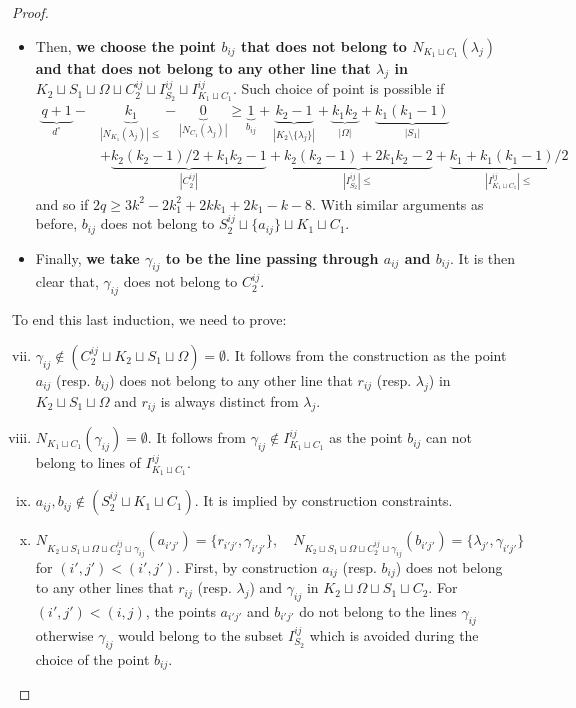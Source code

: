 \documentclass[10pt,a4paper]{article}
\newcommand{\ls}{\leqslant}
\newcommand{\gs}{\geqslant}
\begin{document}
\begin{proof}
\begin{itemize}
            \item Then, \textbf{we choose the point $b_{ij}$ that does not belong to $N_{K_1 \sqcup C_1}(\lambda_j)$ and that does not belong to any other line that $\lambda_j$ in $K_2 \sqcup S_1 \sqcup \Omega \sqcup C_2^{ij} \sqcup I_{S_2}^{ij} \sqcup I_{K_1\sqcup C_1}^{ij}$}. Such choice of point is possible if \begin{align*} \underbrace{q+1}_{d^\circ} - &\underbrace{k_1}_{|N_{K_1}(\lambda_j)|\ls} - \underbrace{0}_{|N_{C_1}(\lambda_j)|} \gs \underbrace{1}_{b_{ij}} + \underbrace{k_2 - 1}_{|K_2 \setminus \{\lambda_j\}|} + \underbrace{k_1k_2}_{|\Omega|} + \underbrace{k_1(k_1-1)}_{|S_1|}\\ &+ \underbrace{k_2(k_2-1)/2+k_1k_2 - 1}_{|C_2^{ij}|} + \underbrace{k_2(k_2-1) + 2k_1k_2 - 2}_{|I_{S_2}^{ij}| \ls} + \underbrace{k_1 + k_1(k_1-1)/2}_{|I_{K_1\sqcup C_1}^{ij}| \ls} \end{align*} and so if $2q \gs 3k^2 - 2k_1^2+2kk_1+2k_1-k-8$. With similar arguments as before,  $b_{ij}$ does not belong to $S_2^{ij} \sqcup \{a_{ij}\} \sqcup K_1 \sqcup C_1$.
            \item Finally, \textbf{we take $\gamma_{ij}$ to be the line passing through  $a_{ij}$ and $b_{ij}$}. It is then clear that, $\gamma_{ij}$ does not belong to $C_2^{ij}$.
        \end{itemize}
        To end this last induction, we need to prove:
        \begin{enumerate}[(i)]
            \setcounter{enumi}{6}
            \item$\gamma_{ij} \notin (C_2^{ij} \sqcup K_2 \sqcup S_1 \sqcup \Omega) = \emptyset$. It follows from the construction as the point $a_{ij}$ (resp. $b_{ij}$) does not belong to any other line that $r_{ij}$ (resp. $\lambda_j$) in $K_2 \sqcup S_1 \sqcup \Omega$ and $r_{ij}$ is always distinct from $\lambda_j$.
            \item $N_{K_1 \sqcup C_1}(\gamma_{ij}) = \emptyset $. It follows from $\gamma_{ij} \notin I_{K_1\sqcup C_1}^{ij}$ as the point $b_{ij}$ can not belong to lines of $I_{K_1\sqcup C_1}^{ij}$.
            \item $a_{ij}, b_{ij} \notin (S_2^{ij} \sqcup K_1 \sqcup C_1)$. It is implied by construction constraints.
            \item $N_{K_2 \sqcup S_1 \sqcup \Omega \sqcup C_2^{ij}\sqcup \gamma_{ij}}(a_{i'j'}) = \{r_{i'j'},\gamma_{i'j'}\}, \quad N_{K_2 \sqcup S_1 \sqcup \Omega \sqcup C_2^{ij}\sqcup \gamma_{ij}}(b_{i'j'}) = \{\lambda_{j'}, \gamma_{i'j'}\}$ \\ for $(i',j') < (i', j')$. First, by construction $a_{ij}$ (resp. $b_{ij}$) does not belong to any other lines that $r_{ij}$ (resp. $\lambda_j$) and $\gamma_{ij}$ in $K_2 \sqcup \Omega \sqcup S_1 \sqcup C_2$. For $(i', j') < (i, j)$, the points $a_{i'j'}$ and $b_{i'j'}$ do not belong to the lines $\gamma_{ij}$ otherwise $\gamma_{ij}$ would belong to the subset $I_{S_2}^{ij}$ which is avoided during the choice of the point $b_{ij}$.
        \end{enumerate}



\end{proof}
\end{document}
